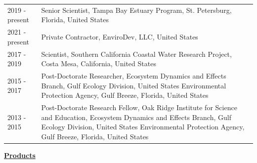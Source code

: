 \documentclass[letterpaper,11pt]{article}
\newcommand{\sechead}[1]{\vspace{6pt}\noindent\underline{\textbf{#1}}\vspace{2pt}\par}
\begin{document}
\begin{longtable}{@{}p{0.9in}p{5.6in}@{}}
2019 - present & Senior Scientist, Tampa Bay Estuary Program, St. Petersburg, Florida, United States \\[4pt]
2021 - present & Private Contractor, EnviroDev, LLC, United States \\[4pt]
2017 - 2019 & Scientist, Southern California Coastal Water Research Project, Costa Mesa, California, United States \\[4pt]
2015 - 2017 & Post-Doctorate Researcher, Ecosystem Dynamics and Effects Branch, Gulf Ecology Division, United States Environmental Protection Agency, Gulf Breeze, Florida, United States \\[4pt]
2013 - 2015 & Post-Doctorate Research Fellow, Oak Ridge Institute for Science and Education, Ecosystem Dynamics and Effects Branch, Gulf Ecology Division, United States Environmental Protection Agency, Gulf Breeze, Florida, United States \\
\end{longtable}

\sechead{Products}
\end{document}
